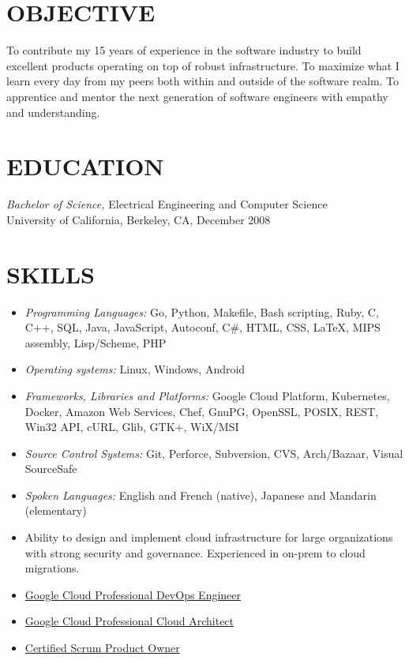 \documentclass[overlapped,line,margin]{res}
\begin{document}
\address{
   Queens, NY, USA
   +1 (510) 646-0724
   \href{https://github.com/joshk0}{joshk0}
   \href{https://linkedin.com/in/joshk0}{joshk0}
   last updated \href{https://circleci.com/gh/joshk0/resume}{\today}
}

\begin{resume}

\section{OBJECTIVE}
To contribute my 15 years of experience in the software industry to
build excellent products operating on top of robust infrastructure.
To maximize what I learn every day from my peers both within and outside
of the software realm.
To apprentice and mentor the next generation of software engineers with
empathy and understanding.

\section{EDUCATION} \textit{Bachelor of Science,} Electrical Engineering and Computer Science \\
  University of California, Berkeley, CA, December 2008

\section{SKILLS}
\begin{itemize}
\item \textit{Programming Languages:} 
  Go, Python, Makefile, Bash scripting, Ruby, C, C++, SQL, Java, JavaScript,
  Autoconf, C\#, HTML, CSS, \LaTeX, MIPS assembly, Lisp/Scheme, PHP
\item \textit{Operating systems:} Linux, Windows, Android
\item \textit{Frameworks, Libraries and Platforms:}
  Google Cloud Platform, Kubernetes, Docker, Amazon Web Services, Chef,
  GnuPG, OpenSSL, POSIX, REST, Win32 API, cURL, Glib, GTK+, WiX/MSI
\item \textit{Source Control Systems:}
  Git, Perforce, Subversion, CVS, Arch/Bazaar, Visual SourceSafe
\item \textit{Spoken Languages:} English and French (native), Japanese and Mandarin (elementary)
\item Ability to design and implement cloud infrastructure for large
  organizations with strong security and governance. Experienced in
  on-prem to cloud migrations.
\item \href{https://www.credential.net/cd3db6be-f769-4350-96fa-1d782c3f30fb?key=04b38dbf7ab7c0b9672ca5e04b9dd3b0d196b34f5a3b588bffb7d804bd547add}{Google Cloud Professional DevOps Engineer}
\item \href{https://www.credential.net/d61c9e7b-bc7d-4861-9dfe-a6aed8b542d3?key=da80861799e43a3181cb466ca22ecc3ed17d34d42422c40b4b834299d62dabaa}{Google Cloud Professional Cloud Architect}
\item \href{http://bcert.me/sfcqbkgtf}{Certified Scrum Product Owner}
\end{itemize}


\end{resume}
\end{document}
